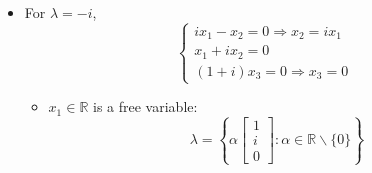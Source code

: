 \documentclass{article}
\begin{document}
\begin{itemize}
\[\begin{array}{c}
            (1-i)x_3 = 0 \Rightarrow x_3=0
        \end{array} \right.
    \]
    \begin{itemize}
        \item $x_1 \in \mathbb{R}$ is a free variable:
        \[
        \lambda = \left\{ \alpha \left[ \begin{array}{c}
            1 \\
            -i \\
            0
        \end{array} \right] : \alpha \in \mathbb{R} \backslash \{0\} \right\}
        \]
    \end{itemize}
    \item For $\lambda = -i$,
    \[
    \left\{ \begin{array}{c}
            ix_1 - x_2 = 0 \Rightarrow x_2 = ix_1 \\
            x_1 + ix_2 = 0 \\
            (1+i)x_3 = 0 \Rightarrow x_3=0
        \end{array} \right.
    \]
    \begin{itemize}
        \item $x_1 \in \mathbb{R}$ is a free variable:
        \[
        \lambda = \left\{ \alpha \left[ \begin{array}{c}
            1 \\
            i \\
            0
        \end{array} \right] : \alpha \in \mathbb{R} \backslash \{0\} \right\}
        \]
    \end{itemize}
\end{itemize}
\end{document}
